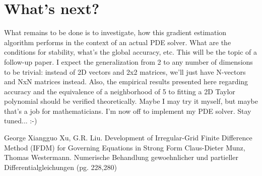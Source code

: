 \section{What's next?}
What remains to be done is to investigate, how this gradient estimation algorithm performs in the context of an actual PDE solver. What are the conditions for stability, what's the global accuracy, etc. This will be the topic of a follow-up paper. I expect the generalization from 2 to any number of dimensions to be trivial: instead of 2D vectors and 2x2 matrices, we'll just have N-vectors and NxN matrices instead. Also, the empirical results presented here regarding accuracy and the equivalence of a neighborhood of 5 to fitting a 2D Taylor polynomial should be verified theoretically. Maybe I may try it myself, but maybe that's a job for mathematicians. I'm now off to implement my PDE solver. Stay tuned... :-)





\begin{thebibliography}{9}  %
  George Xiangguo Xu, G.R. Liu. Development of Irregular-Grid Finite Difference Method (IFDM) for Governing Equations in Strong Form
  Claus-Dieter Munz, Thomas Westermann. Numerische Behandlung gewoehnlicher und partieller Differentialgleichungen (pg. 228,280)
\end{thebibliography}








